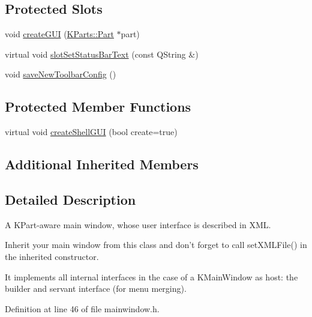 \subsection*{Protected Slots}
\begin{DoxyCompactItemize}
\item 
void \hyperlink{classKParts_1_1MainWindow_ac9064b03c5b9c86676e107f0dd80693b}{create\+G\+U\+I} (\hyperlink{classKParts_1_1Part}{K\+Parts\+::\+Part} $\ast$part)
\item 
virtual void \hyperlink{classKParts_1_1MainWindow_a97b2f32ff0736617b5385274782dd26a}{slot\+Set\+Status\+Bar\+Text} (const Q\+String \&)
\item 
void \hyperlink{classKParts_1_1MainWindow_a7ee678f5096405ef023e49390013c0af}{save\+New\+Toolbar\+Config} ()
\end{DoxyCompactItemize}
\subsection*{Protected Member Functions}
\begin{DoxyCompactItemize}
\item 
virtual void \hyperlink{classKParts_1_1MainWindow_ac388eb6552660ee055c1d41e5f217553}{create\+Shell\+G\+U\+I} (bool create=true)
\end{DoxyCompactItemize}
\subsection*{Additional Inherited Members}


\subsection{Detailed Description}
A K\+Part-\/aware main window, whose user interface is described in X\+M\+L.

Inherit your main window from this class and don't forget to call set\+X\+M\+L\+File() in the inherited constructor.

It implements all internal interfaces in the case of a K\+Main\+Window as host\+: the builder and servant interface (for menu merging). 

Definition at line 46 of file mainwindow.\+h.



